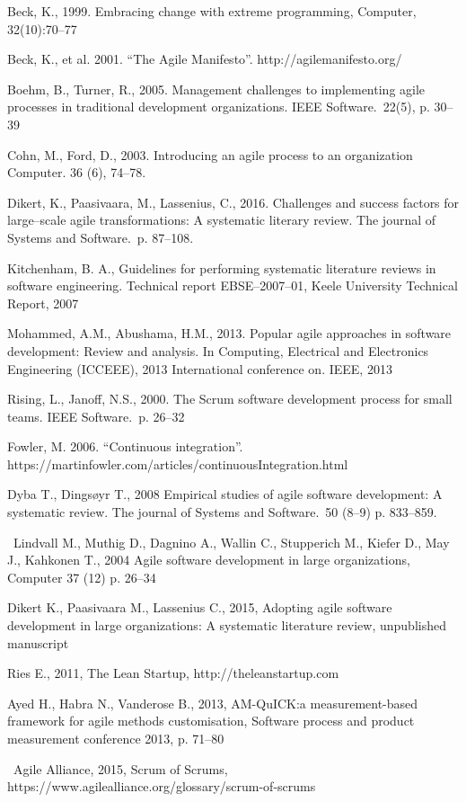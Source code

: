 \noindent [1] Beck, K., 1999. Embracing change with extreme programming, Computer,
32(10):70–77

\noindent [2] Beck, K., et al. 2001. ``The Agile Manifesto''.
http://agilemanifesto.org/

\noindent [3] Boehm, B., Turner, R., 2005. Management challenges to implementing agile
processes in traditional development organizations. IEEE Software.\ 22(5), p. 30–39

\noindent [4] Cohn, M., Ford, D., 2003. Introducing an agile process to an
organization Computer. 36 (6), 74–78.

\noindent [5] Dikert, K., Paasivaara, M., Lassenius, C., 2016. Challenges and success factors
for large–scale agile transformations: A systematic literary review. The journal
of Systems and Software.\ p. 87–108.

\noindent [6] Kitchenham, B. A., Guidelines for performing systematic literature
reviews in software engineering. Technical report EBSE–2007–01, Keele University
Technical Report, 2007

\noindent [7] Mohammed, A.M., Abushama, H.M., 2013. Popular agile approaches in software
development: Review and analysis. In Computing, Electrical and Electronics
Engineering (ICCEEE), 2013 International conference on. IEEE, 2013

\noindent [8] Rising, L., Janoff, N.S., 2000. The Scrum software development process for small teams. IEEE Software.\ p. 26–32

\noindent [9] Fowler, M. 2006. ``Continuous integration''.
https://martinfowler.com/articles/continuousIntegration.html

\noindent [10] Dyba T., Dingsøyr T., 2008 Empirical studies of agile
software development: A systematic review. The journal of Systems and
Software.\ 50 (8–9) p. 833–859.

\noindent [11] Lindvall M., Muthig D., Dagnino A., Wallin C.,
Stupperich M., Kiefer D., May J., Kahkonen T., 2004
Agile software development in large organizations, Computer 37 (12) p. 26–34

\noindent [12] Dikert K., Paasivaara M., Lassenius C., 2015, Adopting agile software development in large organizations: A systematic literature review, unpublished manuscript

\noindent [13] Ries E., 2011, The Lean Startup, http://theleanstartup.com

\noindent [14] Ayed H., Habra N., Vanderose B., 2013, AM-QuICK:\@ a
measurement-based framework for agile methods customisation, Software process
and product measurement conference 2013, p. 71–80

\noindent [15] Agile Alliance, 2015, Scrum of Scrums,
https://www.agilealliance.org/glossary/scrum-of-scrums
